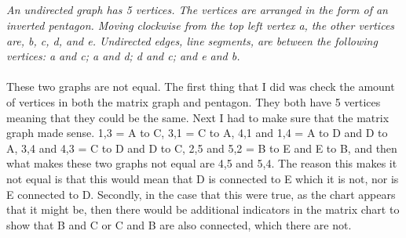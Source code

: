 \begin{enumerate}[label=(\alph*)]
\hfil
  \\\\
\\
\\
   {\color{blue}{\bf Figure 3:} \emph{An undirected graph has 5 vertices. The vertices are arranged in the form of an inverted pentagon. Moving clockwise from the top left vertex a, the other vertices are, b, c, d, and e. Undirected edges, line segments, are between the following vertices: a and c; a and d; d and c; and e and b. 
  \\\\
}
}
These two graphs are not equal. The first thing that I did was check the amount of vertices in both the matrix graph and pentagon. They both have 5 vertices meaning that they could be the same. Next I had to make sure that the matrix graph made sense. {1,3} = A to C, {3,1} = C to A, {4,1} and {1,4} = A to D and D to A, {3,4} and {4,3} = C to D and D to C, {2,5} and {5,2} = B to E and E to B, and then what makes these two graphs not equal are {4,5} and {5,4}. The reason this makes it not equal is that this would mean that D is connected to E which it is not, nor is E connected to D. Secondly, in the case that this were true, as the chart appears that it might be, then there would be additional indicators in the matrix chart to show that B and C or C and B are also connected, which there are not.  

 \newpage

 \


\end{enumerate}
